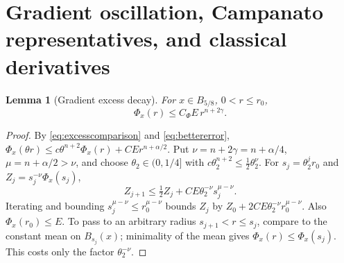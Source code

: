 \documentclass[11pt,a4paper]{article}
\numberwithin{equation}{section}
\newtheorem{lemma}[theorem]{Lemma}
\theoremstyle{definition}
\theoremstyle{remark}
\begin{document}
\section{Gradient oscillation, Campanato representatives, and classical derivatives}
\label{sec:c1}

\begin{lemma}[Gradient excess decay]
\label{lem:excess}
For \(x\in B_{5/8}\), \(0<r\le r_0\),
\begin{equation}\label{eq:excess}
 \Phi_x(r)\le C_\Phi E\,r^{n+2\gamma}.
\end{equation}
\end{lemma}
\begin{proof}
By \eqref{eq:excesscomparison} and \eqref{eq:bettererror},
\(\Phi_x(\theta r)\le c\theta^{n+2}\Phi_x(r)
 +CEr^{n+\alpha/2}\).
Put \(\nu=n+2\gamma=n+\alpha/4\),
\(\mu=n+\alpha/2>\nu\), and choose \(\theta_2\in(0,1/4]\) with
\(c\theta_2^{n+2}\le\tfrac12\theta_2^\nu\).
For \(s_j=\theta_2^jr_0\) and
\(Z_j=s_j^{-\nu}\Phi_x(s_j)\),
\[
 Z_{j+1}\le\tfrac12 Z_j+CE\theta_2^{-\nu}s_j^{\mu-\nu}.
\]
Iterating and bounding \(s_j^{\mu-\nu}\le r_0^{\mu-\nu}\) bounds
\(Z_j\) by \(Z_0+2CE\theta_2^{-\nu}r_0^{\mu-\nu}\).
Also \(\Phi_x(r_0)\le E\). To pass to an arbitrary radius
\(s_{j+1}<r\le s_j\), compare to the constant mean on \(B_{s_j}(x)\);
minimality of the mean gives \(\Phi_x(r)\le\Phi_x(s_j)\).
This costs only the factor \(\theta_2^{-\nu}\).
\end{proof}
\end{document}
